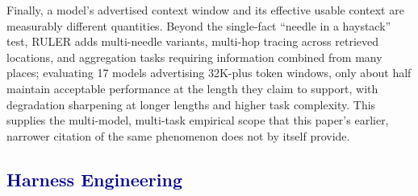 \documentclass[journal]{IEEEtran}
\begin{document}
Finally, a model's advertised context window and its effective usable context are measurably different quantities. Beyond the single-fact ``needle in a haystack'' test, RULER \cite{hsieh2024ruler} adds multi-needle variants, multi-hop tracing across retrieved locations, and aggregation tasks requiring information combined from many places; evaluating 17 models advertising 32K-plus token windows, only about half maintain acceptable performance at the length they claim to support, with degradation sharpening at longer lengths and higher task complexity. This supplies the multi-model, multi-task empirical scope that this paper's earlier, narrower citation of the same phenomenon \cite{liu2023lost} does not by itself provide.

\subsection{\textcolor{darkblue}{Harness Engineering}}
\end{document}
